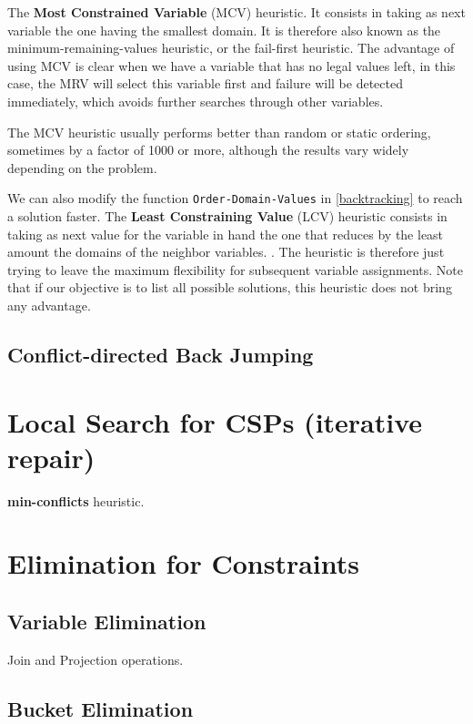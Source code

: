 The \textbf{Most Constrained Variable} (MCV) heuristic. It consists in taking as next variable the one having the smallest domain. It is therefore also known as the minimum-remaining-values heuristic, or the fail-first heuristic. The advantage of using MCV is clear when we have a variable that has no legal values left, in this case, the MRV will select this variable first and failure will be detected immediately, which avoids further searches through other variables.

	The MCV heuristic usually performs better than random or static ordering, sometimes by a factor of 1000 or more, although the results vary widely depending on the problem.

We can also modify the function \texttt{Order-Domain-Values} in \cref{backtracking} to reach a solution faster.
The \textbf{Least Constraining Value} (LCV) heuristic consists in taking as next value for the variable in hand the one that reduces by the least amount the domains of the neighbor variables.
.
The heuristic is therefore just trying to leave the maximum flexibility for subsequent variable assignments.
Note that if our objective is to list all possible solutions, this heuristic does not bring any advantage.

\subsection{Conflict-directed Back Jumping}

\section{Local Search for CSPs (iterative repair)}

\textbf{min-conflicts} heuristic. 

\section{Elimination for Constraints}
\subsection{Variable Elimination}
Join and Projection operations.
\subsection{Bucket Elimination}
